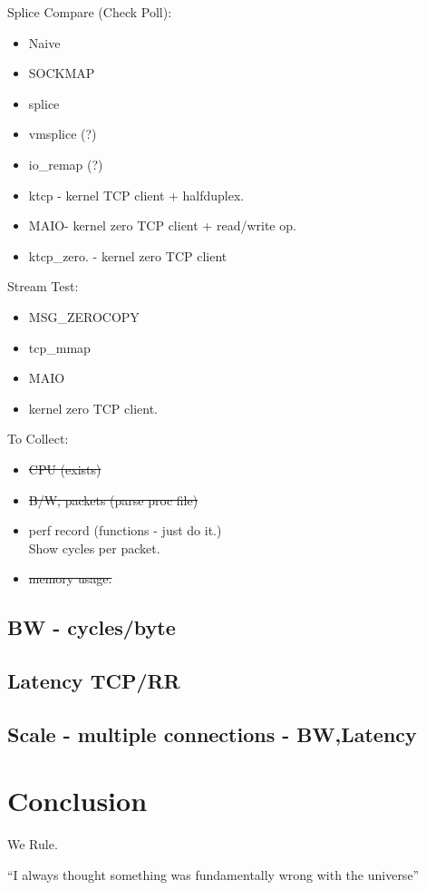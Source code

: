 \documentclass[newfonts=false,format=sigconf,9pt,letterpaper]{acmart}
\newcommand{\oursys}{MAIO\xspace}
\begin{document}
Splice Compare (Check Poll):
\begin{itemize}
    \item Naive
    \item SOCKMAP
    \item splice
    \item vmsplice  (?)
    \item io\_remap (?)
    \item ktcp - kernel TCP client + halfduplex.
    \item \oursys - kernel zero TCP client + read/write op. 
    \item ktcp\_zero. - kernel zero TCP client
\end{itemize}
\smallskip
Stream Test:
\begin{itemize}
    \item MSG\_ZEROCOPY
    \item tcp\_mmap
    \item \oursys
    \item kernel zero TCP client.
\end{itemize}
\smallskip
To Collect:
\begin{itemize}
    \item \st{CPU (exists)}
    \item \st{B/W, packets (parse proc file)}
    \item perf record (functions - just do it.)\\
    Show cycles per packet.
    \item \st{memory usage.}
\end{itemize}
\subsection{BW - cycles/byte}
\subsection{Latency TCP/RR}
\subsection{Scale - multiple connections - BW,Latency}
\section{Conclusion}
We Rule.

``I always thought something was fundamentally wrong with the universe'' \citep{adams1995hitchhiker}



\end{document}
